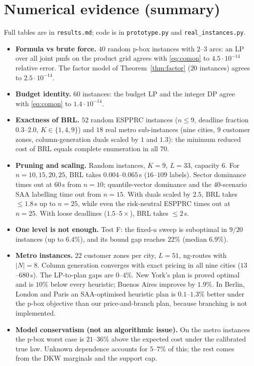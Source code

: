 \documentclass[11pt]{article}
\theoremstyle{definition}
\begin{document}
\section{Numerical evidence (summary)}\label{sec:num}

Full tables are in \texttt{results.md}; code is in \texttt{prototype.py} and \texttt{real\_instances.py}.
\begin{itemize}[leftmargin=*]
\item \textbf{Formula vs brute force.} $40$ random p-box instances with $2$--$3$ arcs: an LP over all joint pmfs on the product grid agrees with \eqref{eq:comon} to $4.5\cdot10^{-14}$ relative error. The factor model of Theorem~\ref{thm:factor} ($20$ instances) agrees to $2.5\cdot10^{-14}$.
\item \textbf{Budget identity.} $60$ instances: the budget LP and the integer DP agree with \eqref{eq:comon} to $1.4\cdot10^{-14}$.
\item \textbf{Exactness of BRL.} $52$ random ESPPRC instances ($n\le9$, deadline fraction $0.3$--$2.0$, $K\in\{1,4,9\}$) and $18$ real metro sub-instances (nine cities, $9$ customer zones, column-generation duals scaled by $1$ and $1.3$): the minimum reduced cost of BRL equals complete enumeration in all $70$.
\item \textbf{Pruning and scaling.} Random instances, $K=9$, $L=33$, capacity $6$. For $n=10,15,20,25$, BRL takes $0.004$--$0.065$\,s ($16$--$109$ labels). Sector dominance times out at $60$\,s from $n=10$; quantile-vector dominance and the $40$-scenario SAA labelling time out from $n=15$. With duals scaled by $2.5$, BRL takes $\le1.8$\,s up to $n=25$, while even the risk-neutral ESPPRC times out at $n=25$. With loose deadlines ($1.5$--$5\times$), BRL takes $\le2$\,s.
\item \textbf{One level is not enough.} Test F: the fixed-$u$ sweep is suboptimal in $9/20$ instances (up to $6.4\%$), and its bound gap reaches $22\%$ (median $6.9\%$).
\item \textbf{Metro instances.} $22$ customer zones per city, $L=51$, ng-routes with $|N|=8$. Column generation converges with exact pricing in all nine cities ($13$--$680$\,s). The LP-to-plan gaps are $0$--$4\%$. New York's plan is proved optimal and is $10\%$ below every heuristic; Buenos Aires improves by $1.9\%$. In Berlin, London and Paris an SAA-optimised heuristic plan is $0.1$--$1.3\%$ better under the p-box objective than our price-and-branch plan, because branching is not implemented.
\item \textbf{Model conservatism (not an algorithmic issue).} On the metro instances the p-box worst case is $21$--$36\%$ above the expected cost under the calibrated true law. Unknown dependence accounts for $5$--$7\%$ of this; the rest comes from the DKW marginals and the support cap.
\end{itemize}
\end{document}
